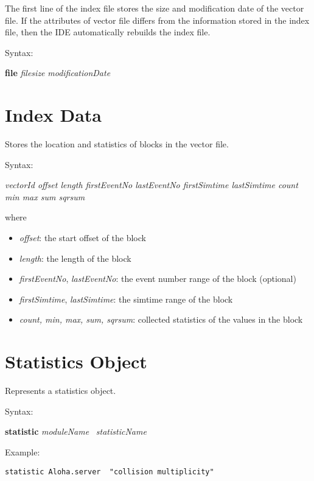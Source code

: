 The first line of the index file stores the size and modification date
of the vector file. If the attributes of vector file differs from
the information stored in the index file, then the IDE automatically
rebuilds the index file.

Syntax:

\hspace{20mm} \textbf{file} \textit{filesize} \textit{modificationDate}

\section{Index Data}

Stores the location and statistics of blocks in the vector file.

Syntax:

\hspace{20mm} {\itshape vectorId offset length firstEventNo lastEventNo
                        firstSimtime lastSimtime
                        count min max sum sqrsum }

where

\begin{itemize}
    \item\textit{offset}: the start offset of the block
    \item\textit{length}: the length of the block
    \item\textit{firstEventNo}, \textit{lastEventNo}:
        the event number range of the block (optional)
    \item\textit{firstSimtime}, \textit{lastSimtime}:
        the simtime range of the block
    \item\textit{count, min, max, sum, sqrsum}:
        collected statistics of the values in the block

\end{itemize}

\section{Statistics Object}

Represents a statistics object.

Syntax:

\hspace{20mm} \textbf{statistic} \textit{moduleName} \ \textit{statisticName}

Example:

\begin{verbatim}
statistic Aloha.server 	"collision multiplicity"
\end{verbatim}

